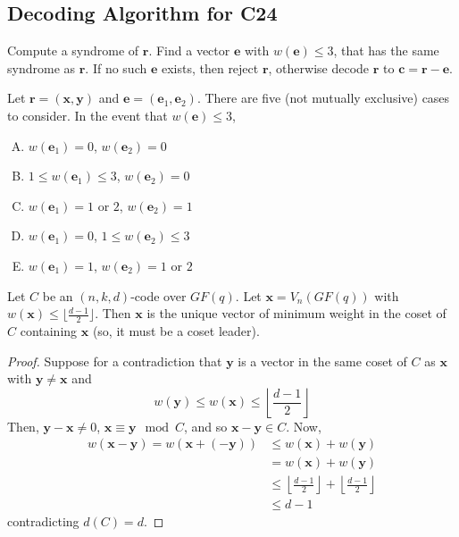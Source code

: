 \subsection{Decoding Algorithm for C24}
Compute a syndrome of $ \bm{r} $. Find a vector $ \bm{e} $ with $ w(\bm{e})\leqslant 3 $,
that has the same syndrome as $ \bm{r} $. If no such $ \bm{e} $ exists, then
reject $ \bm{r} $, otherwise decode $ \bm{r} $ to $ \bm{c}=\bm{r}-\bm{e} $.

Let $ \bm{r}=(\bm{x},\bm{y}) $ and $ \bm{e}=(\bm{e}_1,\bm{e}_2) $.
There are five (not mutually exclusive) cases to consider. In the event that
$ w(\bm{e})\leqslant 3 $,
\begin{enumerate}[(A))]
    \item $ w(\bm{e}_1)=0 $, $ w(\bm{e}_2)=0 $
    \item $ 1\leqslant w(\bm{e}_1)\leqslant 3 $, $ w(\bm{e}_2)=0 $
    \item $ w(\bm{e}_1)=1 $ or $ 2 $, $ w(\bm{e}_2)=1 $
    \item $ w(\bm{e}_1)=0 $, $ 1\leqslant w(\bm{e}_2)\leqslant 3 $
    \item $ w(\bm{e}_1)=1 $, $ w(\bm{e}_2)=1 $ or $ 2 $
\end{enumerate}

\begin{thmbox}
    \begin{theorem}
        Let $ C $ be an $ (n,k,d) $-code over $ GF(q) $. Let $ \bm{x}=
            V_n(GF(q)) $ with $ w(\bm{x})\leqslant \lfloor \frac{d-1}{2} \rfloor $.
        Then $ \bm{x} $ is the unique vector of minimum weight in the coset
        of $ C $ containing $ \bm{x} $ (so, it must be a coset leader).
    \end{theorem}
\end{thmbox}

\begin{proof}
    Suppose for a contradiction that
    $ \bm{y} $ is a vector in the same coset of $ C $ as $ \bm{x} $
    with $ \bm{y}\neq \bm{x} $ and
    \[ w(\bm{y})\leqslant w(\bm{x})\leqslant \left\lfloor \frac{d-1}{2} \right\rfloor \]
    Then, $ \bm{y}-\bm{x}\neq 0 $, $ \bm{x}\equiv \bm{y}\mod C $,
    and so $ \bm{x}-\bm{y}\in C $. Now,
    \begin{align*}
        w(\bm{x}-\bm{y})=w(\bm{x}+(-\bm{y}))
         & \leqslant w(\bm{x})+w(\bm{y})                                                                 \\
         & =w(\bm{x})+w(\bm{y})                                                                          \\
         & \leqslant \left\lfloor \frac{d-1}{2} \right\rfloor + \left\lfloor \frac{d-1}{2} \right\rfloor \\
         & \leqslant d-1
    \end{align*}
    contradicting $ d(C)=d $.
\end{proof}
